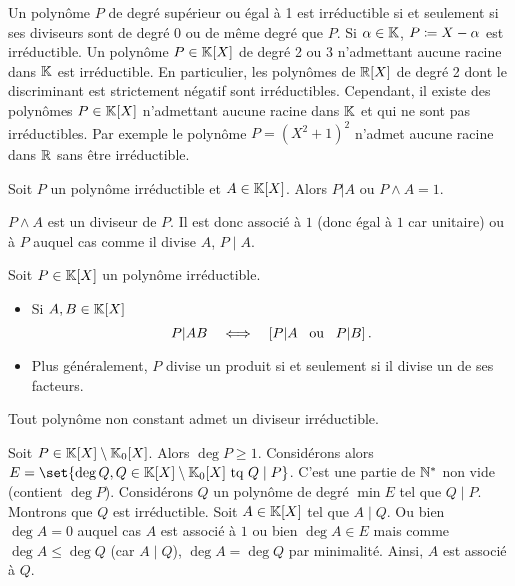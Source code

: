 \documentclass{magnolia}
\begin{document}
\begin{remarques}
\remarque Un polynôme $P$ de degré supérieur ou égal à 1 est irréductible
  si et seulement si ses diviseurs sont de degré 0 ou de même degré
  que $P$.
\remarque Si $\alpha\in\mathbb{K}$, $P\coloneqq X-\alpha$ est irréductible.
\remarque Un polynôme $P\in\polyK$ de degré 2 ou 3 n'admettant aucune racine dans $\mathbb{K}$ est irréductible.
  En particulier, les polynômes de $\polyR$ de degré 2 dont le discriminant est strictement
  négatif sont irréductibles.
  Cependant, il existe des polynômes $P\in\polyK$ n'admettant aucune racine
  dans $\mathbb{K}$ et qui ne sont pas irréductibles. Par exemple le polynôme
  $P=(X^2+1)^2$ n'admet aucune racine dans $\mathbb{R}$ sans être irréductible.
\end{remarques}

\begin{proposition}
Soit $P$ un polynôme irréductible et $A\in\polyK$. Alors $P|A$ ou
$P\wedge A=1$.
\end{proposition}

\begin{preuve}
$P\wedge A$ est un diviseur de $P$. Il est donc associé à $1$ (donc égal à $1$ car unitaire) ou à $P$ auquel cas comme il divise $A$, $P\mid A$.
\end{preuve}

\begin{proposition}
Soit $P\in\polyK$ un polynôme irréductible.
\begin{itemize}
\item Si $A,B\in\polyK$
  \[P|AB \quad\Longleftrightarrow\quad \left[P|A \quad\!\text{ou}\quad\! P|B\right].\]
\item Plus généralement, $P$ divise un produit si et seulement si il divise
  un de ses facteurs.
\end{itemize}
\end{proposition}

\begin{proposition}
Tout polynôme non constant admet un diviseur irréductible.
\end{proposition}

\begin{preuve}
Soit $P \in \polyK\setminus\polyK[0]$. Alors $\deg P\geq 1$.
Considérons alors $E=\set{\deg Q, Q \in \polyK\setminus\polyK[0] \text{ tq } Q\mid P}$. C'est une partie de ${\mathbb{N}^*}$ non vide (contient $\deg P$). Considérons $Q$ un polynôme de degré $\min E$ tel que $Q\mid P$. Montrons que $Q$ est irréductible. Soit $A\in \polyK$ tel que $A\mid Q$. Ou bien $\deg A=0$ auquel cas $A$ est associé à $1$ ou bien $\deg A \in E$ mais comme $\deg A \leq \deg Q$ (car $A\mid Q$), $\deg A=\deg Q$ par minimalité. Ainsi, $A$ est associé à $Q$.
\end{preuve}
\end{document}
